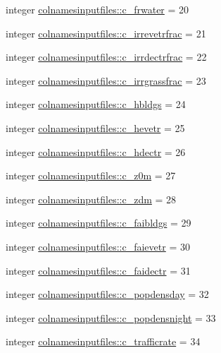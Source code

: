 \begin{DoxyCompactItemize}
\item 
integer \hyperlink{namespacecolnamesinputfiles_a0bc8de048554a16cdf597d25115bbfce}{colnamesinputfiles\+::c\+\_\+frwater} = 20
\item 
integer \hyperlink{namespacecolnamesinputfiles_a469c588da4e0ea1e93f676a96c2b3f0d}{colnamesinputfiles\+::c\+\_\+irrevetrfrac} = 21
\item 
integer \hyperlink{namespacecolnamesinputfiles_a9ed1b8e9314a06c21406c39846ac6b62}{colnamesinputfiles\+::c\+\_\+irrdectrfrac} = 22
\item 
integer \hyperlink{namespacecolnamesinputfiles_ad67f646a9794ac7f54a585a7f2d7b8d8}{colnamesinputfiles\+::c\+\_\+irrgrassfrac} = 23
\item 
integer \hyperlink{namespacecolnamesinputfiles_a0a459714bacb89b022263b1964a22404}{colnamesinputfiles\+::c\+\_\+hbldgs} = 24
\item 
integer \hyperlink{namespacecolnamesinputfiles_a79064204a1b04b9ab7750b534ca759fe}{colnamesinputfiles\+::c\+\_\+hevetr} = 25
\item 
integer \hyperlink{namespacecolnamesinputfiles_a37ecd1e64187c3e98ac5e4d4c08e1180}{colnamesinputfiles\+::c\+\_\+hdectr} = 26
\item 
integer \hyperlink{namespacecolnamesinputfiles_a62828c78b2fe19453ad737c07573f84f}{colnamesinputfiles\+::c\+\_\+z0m} = 27
\item 
integer \hyperlink{namespacecolnamesinputfiles_a74c3c42fe4df332569127f74ce478491}{colnamesinputfiles\+::c\+\_\+zdm} = 28
\item 
integer \hyperlink{namespacecolnamesinputfiles_a876e123c3e15a3a07545672dc4bfafe4}{colnamesinputfiles\+::c\+\_\+faibldgs} = 29
\item 
integer \hyperlink{namespacecolnamesinputfiles_acfe649c237ebb0719e7397cfaf736d72}{colnamesinputfiles\+::c\+\_\+faievetr} = 30
\item 
integer \hyperlink{namespacecolnamesinputfiles_aa3d9641334a3ef6ad84b50559eb8b91c}{colnamesinputfiles\+::c\+\_\+faidectr} = 31
\item 
integer \hyperlink{namespacecolnamesinputfiles_a7c717cd50c52eddd44eac4a880ba08c1}{colnamesinputfiles\+::c\+\_\+popdensday} = 32
\item 
integer \hyperlink{namespacecolnamesinputfiles_a3f73646adefaa458f5320fb1cb3808d6}{colnamesinputfiles\+::c\+\_\+popdensnight} = 33
\item 
integer \hyperlink{namespacecolnamesinputfiles_a1313118ff1eaf23efd4bd5404c07ca1b}{colnamesinputfiles\+::c\+\_\+trafficrate} = 34
\item 

\end{DoxyCompactItemize}
